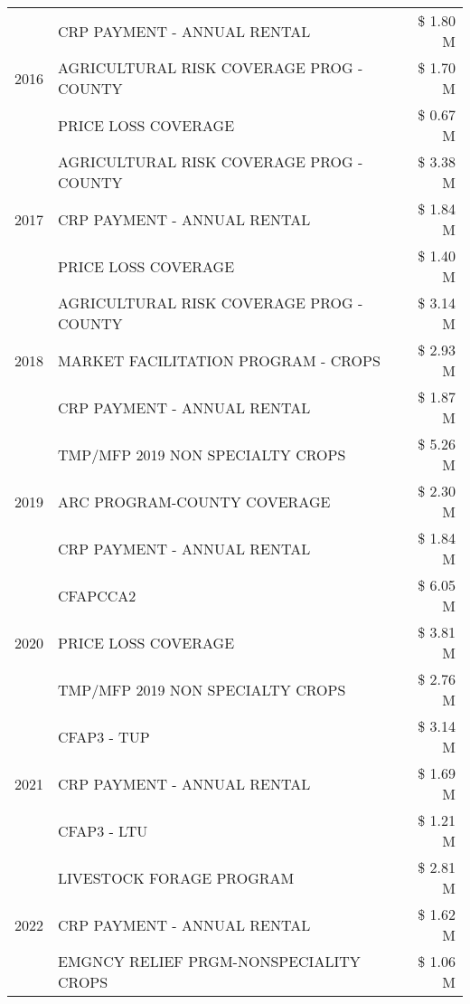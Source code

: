 \begin{tabular}{llr}
\cline{1-3}
\multirow[t]{3}{*}{2016} & CRP PAYMENT - ANNUAL RENTAL & \$ 1.80 M \\
 & AGRICULTURAL RISK COVERAGE PROG - COUNTY & \$ 1.70 M \\
 & PRICE LOSS COVERAGE & \$ 0.67 M \\
\cline{1-3}
\multirow[t]{3}{*}{2017} & AGRICULTURAL RISK COVERAGE PROG - COUNTY & \$ 3.38 M \\
 & CRP PAYMENT - ANNUAL RENTAL & \$ 1.84 M \\
 & PRICE LOSS COVERAGE & \$ 1.40 M \\
\cline{1-3}
\multirow[t]{3}{*}{2018} & AGRICULTURAL RISK COVERAGE PROG - COUNTY & \$ 3.14 M \\
 & MARKET FACILITATION PROGRAM - CROPS & \$ 2.93 M \\
 & CRP PAYMENT - ANNUAL RENTAL & \$ 1.87 M \\
\cline{1-3}
\multirow[t]{3}{*}{2019} & TMP/MFP 2019 NON SPECIALTY CROPS & \$ 5.26 M \\
 & ARC PROGRAM-COUNTY COVERAGE & \$ 2.30 M \\
 & CRP PAYMENT - ANNUAL RENTAL & \$ 1.84 M \\
\cline{1-3}
\multirow[t]{3}{*}{2020} & CFAPCCA2 & \$ 6.05 M \\
 & PRICE LOSS COVERAGE & \$ 3.81 M \\
 & TMP/MFP 2019 NON SPECIALTY CROPS & \$ 2.76 M \\
\cline{1-3}
\multirow[t]{3}{*}{2021} & CFAP3 - TUP & \$ 3.14 M \\
 & CRP PAYMENT - ANNUAL RENTAL & \$ 1.69 M \\
 & CFAP3 - LTU & \$ 1.21 M \\
\cline{1-3}
\multirow[t]{3}{*}{2022} & LIVESTOCK FORAGE PROGRAM & \$ 2.81 M \\
 & CRP PAYMENT - ANNUAL RENTAL & \$ 1.62 M \\
 & EMGNCY RELIEF PRGM-NONSPECIALITY CROPS & \$ 1.06 M \\
\cline{1-3}
\bottomrule
\end{tabular}
